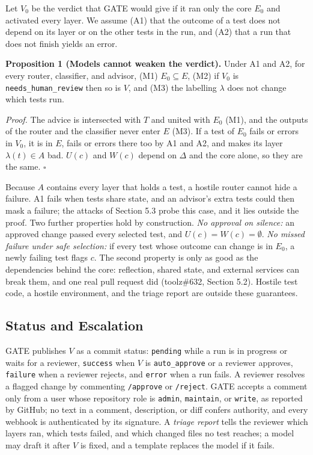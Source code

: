 \documentclass[conference]{IEEEtran}
\begin{document}
Let \(V_0\) be the verdict that GATE would give if it ran only the core \(E_0\) and activated every layer. We assume (A1) that the outcome of a test does not depend on its layer or on the other tests in the run, and (A2) that a run that does not finish yields an error.

\textbf{Proposition 1 (Models cannot weaken the verdict).} Under A1 and A2, for every router, classifier, and advisor, (M1) \(E_0 \subseteq E\), (M2) if \(V_0\) is \texttt{needs\_human\_review} then so is \(V\), and (M3) the labelling \(\lambda\) does not change which tests run.

\emph{Proof.} The advice is intersected with \(T\) and united with \(E_0\) (M1), and the outputs of the router and the classifier never enter \(E\) (M3). If a test of \(E_0\) fails or errors in \(V_0\), it is in \(E\), fails or errors there too by A1 and A2, and makes its layer \(\lambda(t) \in A\) bad. \(U(c)\) and \(W(c)\) depend on \(\Delta\) and the core alone, so they are the same. \(\square\)

Because \(A\) contains every layer that holds a test, a hostile router cannot hide a failure. A1 fails when tests share state, and an advisor's extra tests could then mask a failure; the attacks of Section 5.3 probe this case, and it lies outside the proof. Two further properties hold by construction. \emph{No approval on silence:} an approved change passed every selected test, and \(U(c) = W(c) = \emptyset\). \emph{No missed failure under safe selection:} if every test whose outcome can change is in \(E_0\), a newly failing test flags \(c\). The second property is only as good as the dependencies behind the core: reflection, shared state, and external services can break them, and one real pull request did (toolz\#632, Section 5.2). Hostile test code, a hostile environment, and the triage report are outside these guarantees.

\subsection{Status and Escalation}\label{status-and-escalation}

GATE publishes \(V\) as a commit status: \texttt{pending} while a run is in progress or waits for a reviewer, \texttt{success} when \(V\) is \texttt{auto\_approve} or a reviewer approves, \texttt{failure} when a reviewer rejects, and \texttt{error} when a run fails. A reviewer resolves a flagged change by commenting \texttt{/approve} or \texttt{/reject}. GATE accepts a comment only from a user whose repository role is \texttt{admin}, \texttt{maintain}, or \texttt{write}, as reported by GitHub; no text in a comment, description, or diff confers authority, and every webhook is authenticated by its signature. A \emph{triage report} tells the reviewer which layers ran, which tests failed, and which changed files no test reaches; a model may draft it after \(V\) is fixed, and a template replaces the model if it fails.
\end{document}
